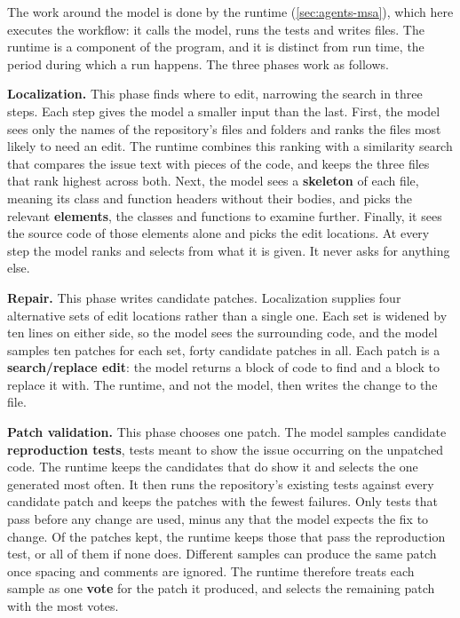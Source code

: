 The work around the model is done by the runtime (\cref{sec:agents-msa}), which here executes the
workflow: it calls the model, runs the tests and writes files. The runtime is a component of the
program, and it is distinct from run time, the period during which a run happens. The three phases
work as follows.
\bi
\item \textbf{Localization.} This phase finds where to edit, narrowing the search in three steps.
Each step gives the model a smaller input than the last. First, the model sees only the names of
the repository's files and folders and ranks the files most likely to need an edit. The runtime
combines this ranking with a similarity search that compares the issue text with pieces of the
code, and keeps the three files that rank highest across both. Next, the model
sees a \textbf{skeleton} of each file, meaning its class and function headers without their bodies,
and picks the relevant \textbf{elements}, the classes and functions to examine further. Finally, it
sees the source code of those elements alone and picks the edit locations. At every step the model
ranks and selects from what it is given. It never asks for anything else.
\item \textbf{Repair.} This phase writes candidate patches. Localization supplies four alternative
sets of edit locations rather than a single one. Each set is widened by ten lines on either side, so
the model sees the surrounding code, and the model samples ten patches for each set, forty
candidate patches in all. Each patch is a \textbf{search/replace edit}: the model returns a block of
code to find and a block to replace it with. The runtime, and not the model, then writes the change
to the file.
\item \textbf{Patch validation.} This phase chooses one patch. The model samples candidate
\textbf{reproduction tests}, tests meant to show the issue occurring on the unpatched code. The
runtime keeps the candidates that do show it and selects the one generated most often. It then runs
the repository's existing tests against every candidate patch and keeps the patches with the fewest
failures. Only tests that pass before any change are used, minus any that the model expects the fix
to change. Of the patches kept, the runtime keeps those that pass the reproduction test, or all of
them if none does. Different samples can produce the same patch once spacing and comments are
ignored. The runtime therefore treats each sample as one \textbf{vote} for the patch it produced,
and selects the remaining patch with the most votes.
\ei

